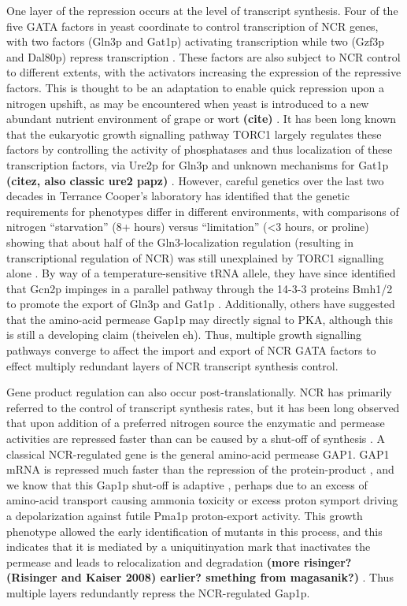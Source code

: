 One layer of
the repression occurs at the level of transcript synthesis. Four of
the five GATA factors in yeast coordinate to control transcription of
NCR genes, with two factors (Gln3p and Gat1p) activating transcription
while two (Gzf3p and Dal80p) repress transcription 
\parencite{hahn2011transcriptional,stanbrough1995transcriptional}. 
These factors are also subject to NCR
control to different extents, with the activators increasing the
expression of the repressive factors. This is thought to be an
adaptation to enable quick repression upon a nitrogen upshift, as may
be encountered when yeast is introduced to a new abundant nutrient
environment of grape or wort 
\textbf{(cite)}
. It has been long known that the
eukaryotic growth signalling pathway TORC1 largely regulates these
factors by controlling the activity of phosphatases and thus
localization of these transcription factors, via Ure2p for Gln3p 
\parencite{beck1999tor} 
and unknown mechanisms for Gat1p
\textbf{(citez, also classic ure2 papz)}
. However, careful genetics over the last two decades in
Terrance Cooper's laboratory has identified that the genetic
requirements for phenotypes differ in different environments, with
comparisons of nitrogen “starvation” (8+ hours) versus “limitation”
(<3 hours, or proline) showing that about half of the
Gln3-localization regulation (resulting in transcriptional regulation
of NCR) was still unexplained by TORC1 signalling alone
\parencite{tate2013five}. By way
of a temperature-sensitive tRNA allele, they have since identified
that Gcn2p impinges in a parallel pathway through the 14-3-3 proteins
Bmh1/2 to promote the export of Gln3p and Gat1p 
\parencite{tate2015gata,tate2017general}. 
Additionally, others have suggested that the
amino-acid permease Gap1p may directly signal to PKA, although this is
still a developing claim (theivelen eh).
Thus, multiple growth signalling pathways converge to
affect the import and export of NCR GATA factors to effect multiply
redundant layers of NCR transcript synthesis control.  

Gene product
regulation can also occur post-translationally. NCR has primarily
referred to the control of transcript synthesis rates, but it has been
long observed that upon addition of a preferred nitrogen source the
enzymatic and permease activities are repressed faster than can be
caused by a shut-off of synthesis 
\parencite{cooper1983function}. A
classical NCR-regulated gene is the general amino-acid permease GAP1.
GAP1 mRNA is repressed much faster than the repression of the
protein-product 
\parencite{stanbrough1995transcriptional}
, and we know that this
Gap1p shut-off is adaptive \parencite{risinger2006activity}, 
perhaps due to an
excess of amino-acid transport causing ammonia toxicity 
\parencite{hess2006ammonium}
or excess proton symport driving a depolarization against futile
Pma1p proton-export activity. This growth phenotype allowed the early
identification of mutants in this process, and this indicates that it
is mediated by a uniquitinyation mark that inactivates the permease
and leads to relocalization and degradation 
\textbf{(more risinger? (Risinger and Kaiser 2008) earlier? smething
from magasanik?)}
. Thus multiple layers redundantly repress
the NCR-regulated Gap1p.  

